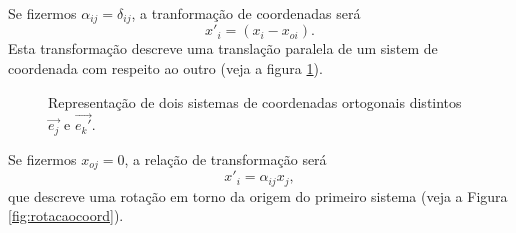 Se fizermos $\alpha_{ij}=\delta_{ij}$, a tranforma\c{c}\~ao de
coordenadas ser\'a
\begin{equation}
x'_{i}=(x_{i}-x_{oi}).
\end{equation}
Esta transforma\c{c}\~ao descreve uma transla\c{c}\~ao paralela de um sistem de coordenada
com respeito ao outro (veja a figura \ref{fig:translacao-paralela}). 
\begin{figure}[!tb]
  \caption{Representa\c{c}\~ao de dois sistemas de coordenadas ortogonais
  distintos $\vec{e_j}$ e $\vec{e_k'}$.}
  \label{fig:translacao-paralela}
\end{figure}
Se fizermos  $x_{oj}=0$, a rela\c{c}\~ao de
transforma\c{c}\~ao ser\'a
\begin{equation}
x'_{i}=\alpha_{ij}x_{j},
\end{equation}
que descreve uma rota\c{c}\~ao em torno da origem do primeiro
sistema (veja a Figura \ref{fig:rotacaocoord}).

